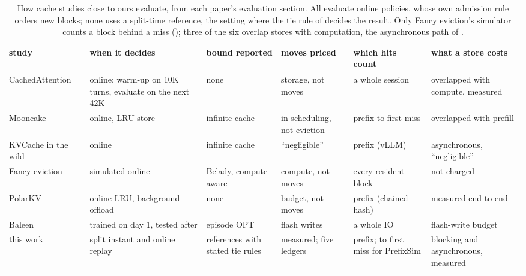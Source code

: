 \begin{table}[t]
\centering\footnotesize\setlength{\tabcolsep}{4pt}
\begin{tabular}{@{}p{2.9cm}p{3.2cm}p{2.1cm}p{2.3cm}p{2.6cm}p{3.1cm}@{}}
\toprule
study & when it decides & bound reported & moves priced & which hits count & what a store costs \\
\midrule
CachedAttention~\cite{gao2024cachedattention} & online; warm-up on 10K turns, evaluate on the next 42K & none & storage, not moves & a whole session & overlapped with compute, measured \\
Mooncake~\cite{qin2024mooncake} & online, LRU store & infinite cache & in scheduling, not eviction & prefix to first miss & overlapped with prefill \\
KVCache in the wild~\cite{wang2025kvcachewild} & online & infinite cache & ``negligible'' & prefix (vLLM) & asynchronous, ``negligible'' \\
Fancy eviction~\cite{liu2026fancyeviction} & simulated online & Belady, compute-aware & compute, not moves & every resident block & not charged \\
PolarKV~\cite{zhang2026polarkv} & online LRU, background offload & none & budget, not moves & prefix (chained hash) & measured end to end \\
Baleen~\cite{S12_wong2024baleen} & trained on day 1, tested after & episode OPT & flash writes & a whole IO & flash-write budget \\
\midrule
this work & split instant and online replay & references with stated tie rules & measured; five ledgers & prefix; to first miss for PrefixSim & blocking and asynchronous, measured \\
\bottomrule
\end{tabular}
\caption{How cache studies close to ours evaluate, from each paper's evaluation section. All evaluate online
policies, whose own admission rule orders new blocks; none uses a split-time reference, the setting where
the tie rule of  decides the result. Only Fancy eviction's simulator counts a block behind a
miss (); three of the six overlap stores with computation, the asynchronous path of
.}
\label{tab:protocols}
\end{table}


